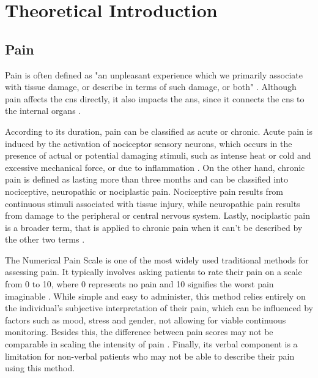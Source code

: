 \chapter{Theoretical Introduction}


\section{Pain}

Pain is often defined as "an unpleasant experience which we primarily 
associate with tissue damage, or describe in terms
of such damage, or both" \cite{Fang2025}. Although pain affects the \ac{cns} directly, it also impacts the \ac{ans}, since it connects the \ac{cns} to the internal organs \cite{Moscato2022}.

According to its duration, pain can be classified as acute or chronic. Acute pain is induced by the activation of nociceptor sensory neurons, which occurs in the presence of actual or potential damaging stimuli, such as intense heat or cold and excessive mechanical force, or due to inflammation \cite{Jayakar2021}. On the other hand, chronic pain is defined as lasting more than three months \cite{Raman2022} and can be classified into nociceptive, neuropathic or nociplastic pain. Nociceptive pain results from continuous stimuli associated with tissue injury, while neuropathic pain results from damage to the peripheral or central nervous system. Lastly, nociplastic pain is a broader term, that is applied to chronic pain when it can't be described by the other two terms \cite{Fitzcharles2021}.

The Numerical Pain Scale is one of the most widely used traditional methods for assessing pain. It typically involves asking patients to rate their pain on a scale from 0 to 10, where 0 represents no pain and 10 signifies the worst pain imaginable \cite{Nugent2021}. While simple and easy to administer, this method relies entirely on the individual’s subjective interpretation of their pain, which can be influenced by factors such as mood, stress and gender, not allowing for viable continuous monitoring. Besides this, the difference between pain scores may not be comparable in scaling the intensity of pain \cite{Adeboye2021}. Finally, its verbal component is a limitation for non-verbal patients who may not be able to describe their pain using this method.

